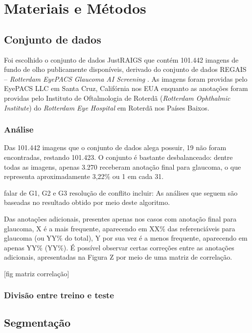 \documentclass[12pt]{article}
\begin{document}
\bigskip

\section{Materiais e Métodos}
\label{sec:methodology}

\subsection{Conjunto de dados}
\label{sec:dataset}

Foi escolhido o conjunto de dados JustRAIGS \cite{justraigs} que contém 101.442 imagens de fundo de olho publicamente disponíveis, derivado do conjunto de dados REGAIS – \emph{Rotterdam EyePACS Glaucoma AI Screening} \cite{justraigs_article}. As imagens foram providas pelo EyePACS LLC em Santa Cruz, Califórnia nos EUA enquanto as anotações foram providas pelo Instituto de Oftalmologia de Roterdã (\emph{Rotterdam Ophthalmic Institute}) do \emph{Rotterdam Eye Hospital} em Roterdã nos Países Baixos.

\subsubsection{Análise}
\label{sec:dataset:analysis}
Das 101.442 imagens que o conjunto de dados alega possuir, 19 não foram encontradas, restando 101.423. O conjunto é bastante desbalanceado: dentre todas as imagens, apenas 3.270 receberam anotação final para glaucoma, o que representa aproximadamente 3,22\% ou 1 em cada 31.

falar de G1, G2 e G3
resolução de conflito
incluir: As análises que seguem são baseadas no resultado obtido por meio deste algoritmo.

Das anotações adicionais, presentes apenas nos casos com anotação final para glaucoma, X é a mais frequente, aparecendo em XX\% das referenciáveis para glaucoma (ou YY\% do total), Y por sua vez é a menos frequente, aparecendo em apenas YY\% (YY\%). É possível observar certas correções entre as anotações adicionais, apresentadas na Figura Z por meio de uma matriz de correlação.

[fig matriz correlação]

\subsubsection{Divisão entre treino e teste}
\label{sec:dataset:split}

\subsection{Segmentação}
\label{sec:segmentation}
\end{document}
